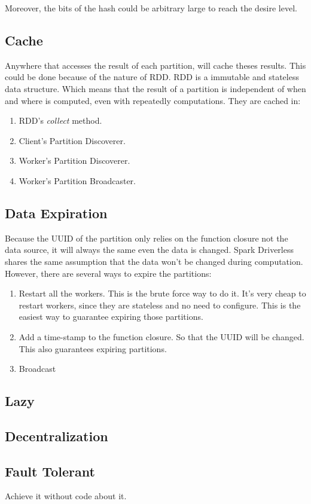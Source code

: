 Moreover, the bits of the hash could be arbitrary large to reach the desire level.

\subsection{Cache} %
\label{sub:cache}
Anywhere that accesses the result of each partition, will cache theses results.
This could be done because of the nature of RDD\@.
RDD is a immutable and stateless data structure.
Which means that the result of a partition is independent of when and where is computed,
even with repeatedly computations.
They are cached in:
\begin{enumerate}
    \item RDD's \emph{collect} method.
    \item Client's Partition Discoverer.
    \item Worker's Partition Discoverer.
    \item Worker's Partition Broadcaster.
\end{enumerate}

\subsection{Data Expiration} %
\label{sub:data_expiration}
Because the UUID of the partition only relies on the function closure not the data source,
it will always the same even the data is changed.
Spark Driverless shares the same assumption that the data won't be changed during computation.
However, there are several ways to expire the partitions:
\begin{enumerate}
    \item Restart all the workers.
    This is the brute force way to do it.
    It's very cheap to restart workers, since they are stateless and no need to configure.
    This is the easiest way to guarantee expiring those partitions.
    \item Add a time-stamp to the function closure.
    So that the UUID will be changed.
    This also guarantees expiring partitions.
    \item Broadcast
\end{enumerate}

\subsection{Lazy} %
\label{sub:lazy}


\subsection{Decentralization} %
\label{sub:decentralization}


\subsection{Fault Tolerant} %
\label{sub:fault_tolerant}
Achieve it without code about it.


